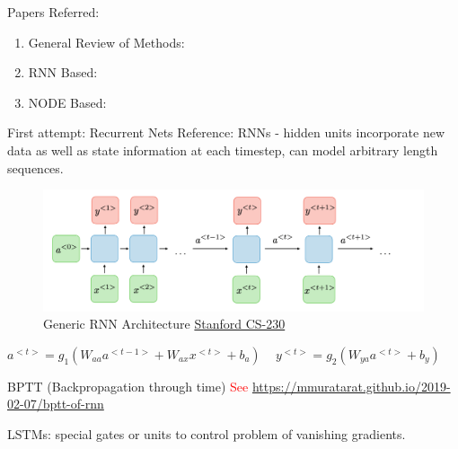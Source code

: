 \documentclass{beamer}
\begin{document}
\begin{frame}{Papers Referred:}
\begin{enumerate}
    \item General Review of Methods: \cite{shchur_neural_2021}

    \item RNN Based: \cite{Nan2016}

    \item NODE Based: \cite{jia_neural_2020}
\end{enumerate}
    
\end{frame}

\begin{frame}{First attempt: Recurrent Nets}
    Reference: \cite{Nan2016}
    RNNs - hidden units incorporate new data as well as state information at each timestep, can model arbitrary length sequences.

    \begin{figure}
        \centering
        \includegraphics[width=0.7\linewidth]{slides_20231201//figures/rnn_arch_sfcs.png}
        \caption{Generic RNN Architecture \href{https://stanford.edu/~shervine/teaching/cs-230/cheatsheet-recurrent-neural-networks}{Stanford CS-230}}
        \label{fig:rnn_arch}
    \end{figure}

    $a^{<t>}=g_1(W_{aa}a^{<t-1>}+W_{ax}x^{<t>}+b_a)\, \quad y^{<t>}=g_2(W_{ya}a^{<t>}+b_y)$

    BPTT (Backpropagation through time) \textcolor{red}{See \url{https://mmuratarat.github.io/2019-02-07/bptt-of-rnn}}
    
    LSTMs: special gates or units to control problem of vanishing gradients. \cite{hochreiter_2009}
\end{frame}
\end{document}
